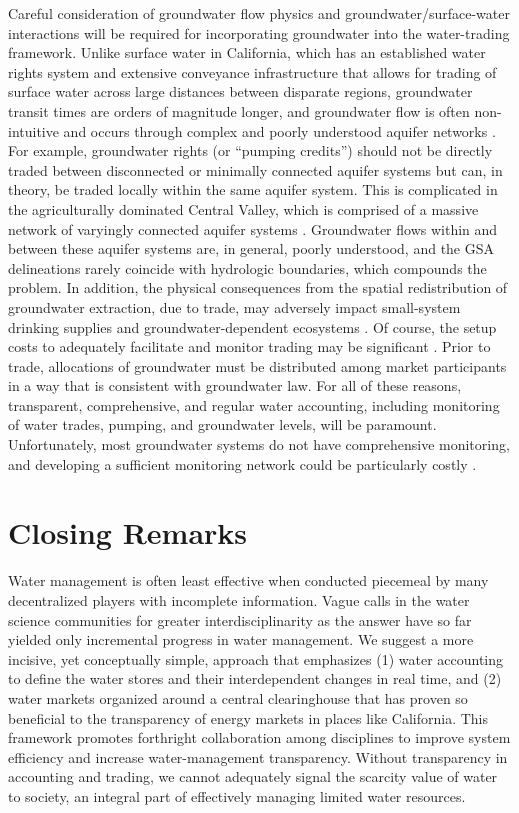 Careful consideration of groundwater flow physics and groundwater/surface-water interactions will be required for incorporating groundwater into the water-trading framework. Unlike surface water in California, which has an established water rights system and extensive conveyance infrastructure that allows for trading of surface water across large distances between disparate regions, groundwater transit times are orders of magnitude longer, and groundwater flow is often non-intuitive and occurs through complex and poorly understood aquifer networks \citep{alley2002flow}. For example, groundwater rights (or “pumping credits”) should not be directly traded between disconnected or minimally connected aquifer systems but can, in theory, be traded locally within the same aquifer system. This is complicated in the agriculturally dominated Central Valley, which is comprised of a massive network of varyingly connected aquifer systems \citep{faunt2009groundwater}. Groundwater flows within and between these aquifer systems are, in general, poorly understood, and the GSA delineations rarely coincide with hydrologic boundaries, which compounds the problem. In addition, the physical consequences from the spatial redistribution of groundwater extraction, due to trade, may adversely impact small-system drinking supplies and groundwater-dependent ecosystems \citep{green_nylen_trading_2017}. 
Of course, the setup costs to adequately facilitate and monitor trading may be significant \citep{moran_ground_2016}. Prior to trade, allocations of groundwater must be distributed among market participants in a way that is consistent with groundwater law. For all of these reasons, transparent, comprehensive, and regular water accounting, including monitoring of water trades, pumping, and groundwater levels, will be paramount. Unfortunately, most groundwater systems do not have comprehensive monitoring, and developing a sufficient monitoring network could be particularly costly \citep{nelson_assessing_2012}.

\section{Closing Remarks}

Water management is often least effective when conducted piecemeal by many decentralized players with incomplete information. Vague calls in the water science communities for greater interdisciplinarity as the answer have so far yielded only incremental progress in water management. We suggest a more incisive, yet conceptually simple, approach that emphasizes (1) water accounting to define the water stores and their interdependent changes in real time, and (2) water markets organized around a central clearinghouse that has proven so beneficial to the transparency of energy markets in places like California. This framework promotes forthright collaboration among disciplines to improve system efficiency and increase water-management transparency. Without transparency in accounting and trading, we cannot adequately signal the scarcity value of water to society, an integral part of effectively managing limited water resources.

